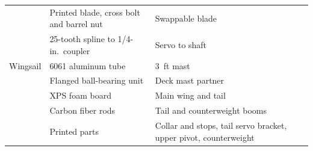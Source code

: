 \begin{table}[!t]
\begin{tabular}{@{}p{}p{}p{}@{}}
       & Printed blade, cross bolt and barrel nut & Swappable blade \\
       & 25-tooth spline to 1/4-in.\ coupler & Servo to shaft \\
Wingsail & 6061 aluminum tube & \SI{3}{ft} mast \\
         & Flanged ball-bearing unit & Deck mast partner \\
         & XPS foam board & Main wing and tail \\
         & Carbon fiber rods & Tail and counterweight booms \\
         & Printed parts & Collar and stops, tail servo bracket, upper pivot, counterweight \\
\bottomrule
\end{tabular}
\end{table}


